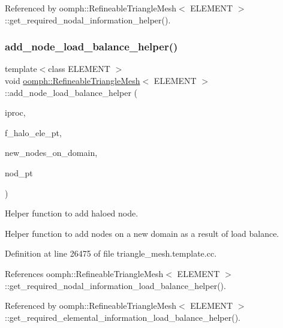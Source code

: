 Referenced by oomph\+::\+Refineable\+Triangle\+Mesh$<$ E\+L\+E\+M\+E\+N\+T $>$\+::get\+\_\+required\+\_\+nodal\+\_\+information\+\_\+helper().

\mbox{\label{classoomph_1_1RefineableTriangleMesh_a153def40c53393fdec956c17b6368bda}} 
\subsubsection{\texorpdfstring{add\+\_\+node\+\_\+load\+\_\+balance\+\_\+helper()}{add\_node\_load\_balance\_helper()}}
{\footnotesize\ttfamily template$<$class E\+L\+E\+M\+E\+NT $>$ \\
void \hyperlink{classoomph_1_1RefineableTriangleMesh}{oomph\+::\+Refineable\+Triangle\+Mesh}$<$ E\+L\+E\+M\+E\+NT $>$\+::add\+\_\+node\+\_\+load\+\_\+balance\+\_\+helper (\begin{DoxyParamCaption}\item[{unsigned \&}]{iproc,  }\item[{Vector$<$ Vector$<$ Finite\+Element $\ast$$>$ $>$ \&}]{f\+\_\+halo\+\_\+ele\+\_\+pt,  }\item[{Vector$<$ Node $\ast$$>$ \&}]{new\+\_\+nodes\+\_\+on\+\_\+domain,  }\item[{Node $\ast$}]{nod\+\_\+pt }\end{DoxyParamCaption})\hspace{0.3cm}{\ttfamily [protected]}}



Helper function to add haloed node. 

Helper function to add nodes on a new domain as a result of load balance. 

Definition at line 26475 of file triangle\+\_\+mesh.\+template.\+cc.



References oomph\+::\+Refineable\+Triangle\+Mesh$<$ E\+L\+E\+M\+E\+N\+T $>$\+::get\+\_\+required\+\_\+nodal\+\_\+information\+\_\+load\+\_\+balance\+\_\+helper().



Referenced by oomph\+::\+Refineable\+Triangle\+Mesh$<$ E\+L\+E\+M\+E\+N\+T $>$\+::get\+\_\+required\+\_\+elemental\+\_\+information\+\_\+load\+\_\+balance\+\_\+helper().

